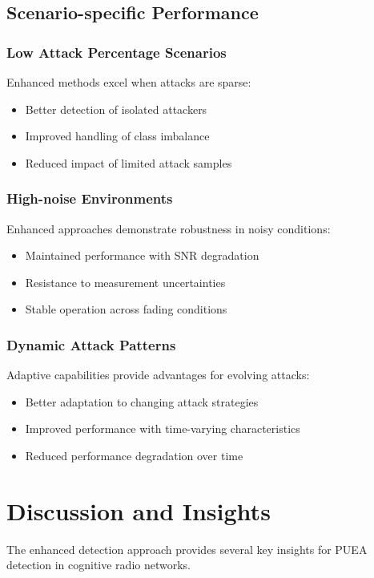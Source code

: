 \subsection{Scenario-specific Performance}

\subsubsection{Low Attack Percentage Scenarios}
Enhanced methods excel when attacks are sparse:
\begin{itemize}
\item Better detection of isolated attackers
\item Improved handling of class imbalance
\item Reduced impact of limited attack samples
\end{itemize}

\subsubsection{High-noise Environments}
Enhanced approaches demonstrate robustness in noisy conditions:
\begin{itemize}
\item Maintained performance with SNR degradation
\item Resistance to measurement uncertainties
\item Stable operation across fading conditions
\end{itemize}

\subsubsection{Dynamic Attack Patterns}
Adaptive capabilities provide advantages for evolving attacks:
\begin{itemize}
\item Better adaptation to changing attack strategies
\item Improved performance with time-varying characteristics
\item Reduced performance degradation over time
\end{itemize}

\section{Discussion and Insights}
The enhanced detection approach provides several key insights for PUEA detection in cognitive radio networks.

